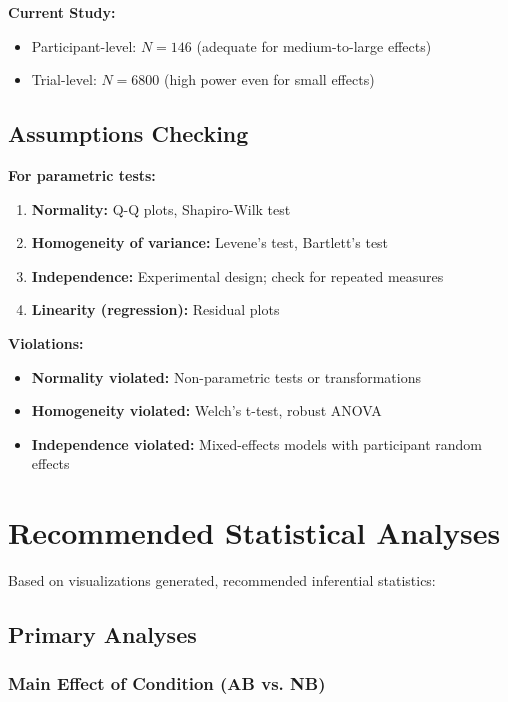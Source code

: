 \documentclass[12pt,a4paper]{article}
\begin{document}
\textbf{Current Study:}
\begin{itemize}
    \item Participant-level: $N=146$ (adequate for medium-to-large effects)
    \item Trial-level: $N=6800$ (high power even for small effects)
\end{itemize}

\subsection{Assumptions Checking}

\textbf{For parametric tests:}
\begin{enumerate}
    \item \textbf{Normality:} Q-Q plots, Shapiro-Wilk test
    \item \textbf{Homogeneity of variance:} Levene's test, Bartlett's test
    \item \textbf{Independence:} Experimental design; check for repeated measures
    \item \textbf{Linearity (regression):} Residual plots
\end{enumerate}

\textbf{Violations:}
\begin{itemize}
    \item \textbf{Normality violated:} Non-parametric tests or transformations
    \item \textbf{Homogeneity violated:} Welch's t-test, robust ANOVA
    \item \textbf{Independence violated:} Mixed-effects models with participant random effects
\end{itemize}

\newpage
\section{Recommended Statistical Analyses}

Based on visualizations generated, recommended inferential statistics:

\subsection{Primary Analyses}

\subsubsection{Main Effect of Condition (AB vs. NB)}
\end{document}
